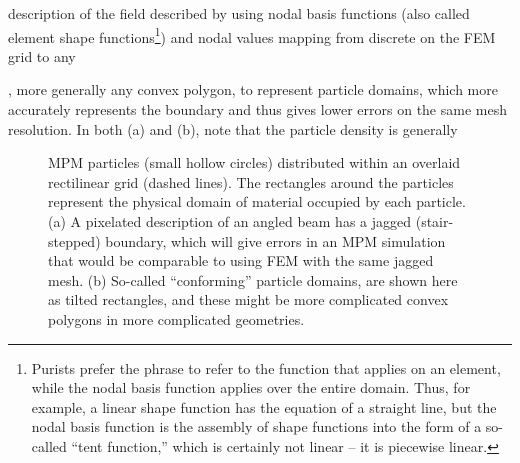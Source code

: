 \newpage
description of the field  described by using nodal basis functions (also called element shape functions\footnote{Purists prefer the phrase  to refer to the function that applies on an element, while the nodal basis function applies over the entire domain. Thus, for example, a linear shape function has the equation of a straight line, but the nodal basis function is the assembly of shape functions into the form of a so-called ``tent function,'' which is certainly not linear -- it is piecewise linear.}) and nodal values mapping from discrete  on the FEM grid to any 

,  more generally any convex polygon, to represent particle domains, which more accurately represents the boundary and thus gives lower errors on the same mesh resolution.  In both (a) and (b), note that the particle density is generally
\begin{figure}
\label{fig:CPDIstairSteppingGeometry}
\caption{MPM particles (small hollow circles) distributed within an overlaid rectilinear grid (dashed lines). The rectangles around the particles represent the physical domain of material occupied by each particle. (a) A pixelated description of an angled beam has a jagged (stair-stepped) boundary, which will give errors in an MPM simulation that would be comparable to using FEM with the same jagged mesh. (b) So-called ``conforming'' particle domains, are shown here as tilted rectangles, and these might be more complicated convex polygons in more complicated geometries.}
\end{figure}












